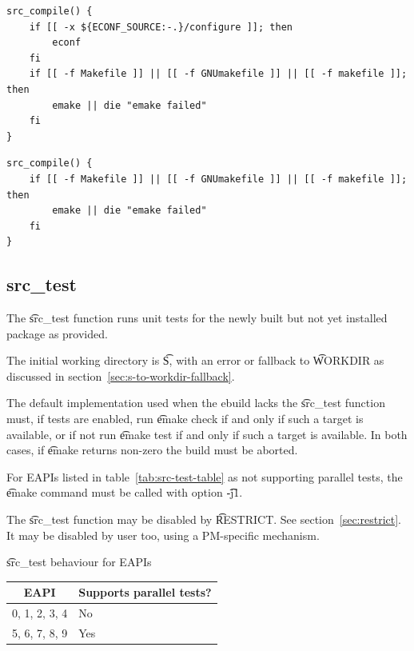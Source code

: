 \begin{listing}[H]
\caption{\t{src_compile}, format~1} \label{lst:src-compile-1}
\begin{verbatim}
src_compile() {
    if [[ -x ${ECONF_SOURCE:-.}/configure ]]; then
        econf
    fi
    if [[ -f Makefile ]] || [[ -f GNUmakefile ]] || [[ -f makefile ]]; then
        emake || die "emake failed"
    fi
}
\end{verbatim}
\end{listing}

\begin{listing}[H]
\caption{\t{src_compile}, format~2} \label{lst:src-compile-2}
\begin{verbatim}
src_compile() {
    if [[ -f Makefile ]] || [[ -f GNUmakefile ]] || [[ -f makefile ]]; then
        emake || die "emake failed"
    fi
}
\end{verbatim}
\end{listing}

\subsection{src_test}

The \t{src_test} function runs unit tests for the newly built but not yet installed package as
provided.

The initial working directory is \t{S}, with an error or fallback to \t{WORKDIR} as discussed in
section~\ref{sec:s-to-workdir-fallback}.

The default implementation used when the ebuild lacks the \t{src_test} function must, if tests are
enabled, run \t{emake check} if and only if such a target is available, or if not run
\t{emake test} if and only if such a target is available. In both cases, if \t{emake} returns
non-zero the build must be aborted.

 For EAPIs listed in table~\ref{tab:src-test-table} as not supporting
parallel tests, the \t{emake} command must be called with option \t{-j1}.

The \t{src_test} function may be disabled by \t{RESTRICT}\@. See section~\ref{sec:restrict}. It may
be disabled by user too, using a PM-specific mechanism.

\begin{centertable}{\t{src_test} behaviour for EAPIs}
    \label{tab:src-test-table}
    \begin{tabular}{ll}
      \toprule
      \multicolumn{1}{c}{\textbf{EAPI}} &
      \multicolumn{1}{c}{\textbf{Supports parallel tests?}} \\
      \midrule
      0, 1, 2, 3, 4     & No  \\
      5, 6, 7, 8, 9     & Yes \\
      \bottomrule
    \end{tabular}
\end{centertable}

